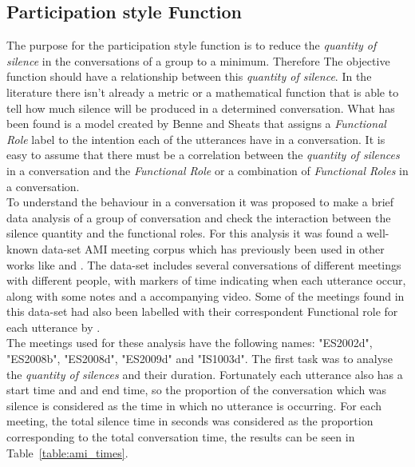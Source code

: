 \subsection{Participation style Function}

The purpose for the participation style function is to reduce the \textit{quantity of silence} in the conversations of a group to a minimum. Therefore The objective function should have a relationship between this \textit{quantity of silence}. In the literature there isn't already a metric or a mathematical function that is able to tell how much silence will be produced in a determined conversation. What has been found is a model created by Benne and Sheats \cite{FunctionalRoles} that assigns a \textit{Functional Role} label to the intention each of the utterances have in a conversation. It is easy to assume that there must be a correlation between the \textit{quantity of silences} in a conversation and the \textit{Functional Role} or a combination of \textit{Functional Roles} in a conversation.\\

To understand the behaviour in a conversation it was proposed to make a brief data analysis of a group of conversation and check the interaction between the silence quantity and the functional roles. For this analysis it was found a well-known data-set AMI meeting corpus \cite{mccowan2005ami} which has previously been used in other works like \cite{dong2012modeling} and \cite{Matsuyama2015Four-participantParticipant}. The data-set includes several conversations of different meetings with different people, with markers of time indicating when each utterance occur, along with some notes and a accompanying video. Some of the meetings found in this data-set had also been labelled with their correspondent Functional role for each utterance by \cite{dong2012modeling}.\\

The meetings used for these analysis have the following names: "ES2002d", "ES2008b", "ES2008d", "ES2009d" and "IS1003d". The first task was to analyse the \textit{quantity of silences} and their duration. Fortunately each utterance also has a start time and and end time, so the proportion of the conversation which was silence is considered as the time in which no utterance is occurring. For each meeting, the total silence time in seconds was considered as the proportion corresponding to the total conversation time, the results can be seen in Table~\ref{table:ami_times}.\\

